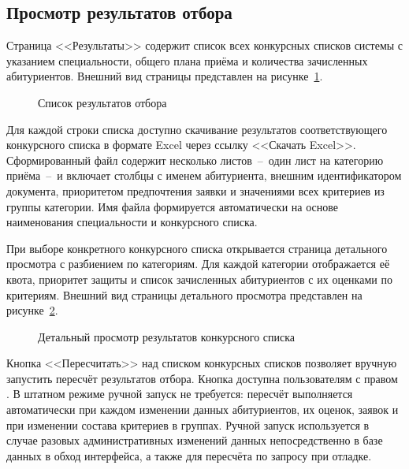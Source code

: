 \subsection{Просмотр результатов отбора}

Страница <<Результаты>> содержит список всех конкурсных списков системы с указанием специальности, общего плана приёма и количества зачисленных абитуриентов.
Внешний вид страницы представлен на рисунке~\ref{fig:results}.

\begin{figure}[htbp]
\centering
{}
\caption{Список результатов отбора}
\label{fig:results}
\end{figure}

Для каждой строки списка доступно скачивание результатов соответствующего конкурсного списка в формате Excel через ссылку <<Скачать Excel>>.
Сформированный файл содержит несколько листов~--~один лист на категорию приёма~--~и включает столбцы с именем абитуриента, внешним идентификатором документа, приоритетом предпочтения заявки и значениями всех критериев из группы категории.
Имя файла формируется автоматически на основе наименования специальности и конкурсного списка.

При выборе конкретного конкурсного списка открывается страница детального просмотра с разбиением по категориям.
Для каждой категории отображается её квота, приоритет защиты и список зачисленных абитуриентов с их оценками по критериям.
Внешний вид страницы детального просмотра представлен на рисунке~\ref{fig:competitionresult}.

\begin{figure}[htbp]
\centering
{}
\caption{Детальный просмотр результатов конкурсного списка}
\label{fig:competitionresult}
\end{figure}

Кнопка <<Пересчитать>> над списком конкурсных списков позволяет вручную запустить пересчёт результатов отбора.
Кнопка доступна пользователям с правом .
В штатном режиме ручной запуск не требуется: пересчёт выполняется автоматически при каждом изменении данных абитуриентов, их оценок, заявок и при изменении состава критериев в группах.
Ручной запуск используется в случае разовых административных изменений данных непосредственно в базе данных в обход интерфейса, а также для пересчёта по запросу при отладке.

